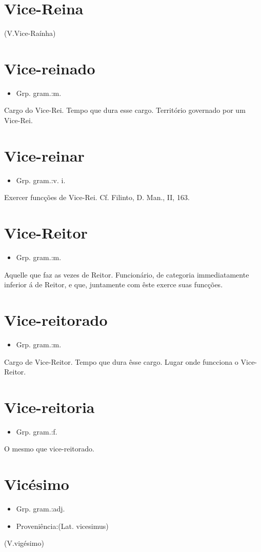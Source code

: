 \documentclass{article}
\begin{document}
\section{Vice-Reina}
(V.Vice-Raínha)
\section{Vice-reinado}
\begin{itemize}
\item {Grp. gram.:m.}
\end{itemize}
Cargo do Vice-Rei.
Tempo que dura esse cargo.
Território governado por um Vice-Rei.
\section{Vice-reinar}
\begin{itemize}
\item {Grp. gram.:v. i.}
\end{itemize}
Exercer funcções de Vice-Rei. Cf. Filinto, \textunderscore D. Man.\textunderscore , II, 163.
\section{Vice-Reitor}
\begin{itemize}
\item {Grp. gram.:m.}
\end{itemize}
Aquelle que faz as vezes de Reitor.
Funcionário, de categoria immediatamente inferior á de Reitor, e que, juntamente com êste exerce suas funcções.
\section{Vice-reitorado}
\begin{itemize}
\item {Grp. gram.:m.}
\end{itemize}
Cargo de Vice-Reitor.
Tempo que dura êsse cargo.
Lugar onde funcciona o Vice-Reitor.
\section{Vice-reitoria}
\begin{itemize}
\item {Grp. gram.:f.}
\end{itemize}
O mesmo que \textunderscore vice-reitorado\textunderscore .
\section{Vicésimo}
\begin{itemize}
\item {Grp. gram.:adj.}
\end{itemize}
\begin{itemize}
\item {Proveniência:(Lat. \textunderscore vicesimus\textunderscore )}
\end{itemize}
(V.vigésimo)
\end{document}
